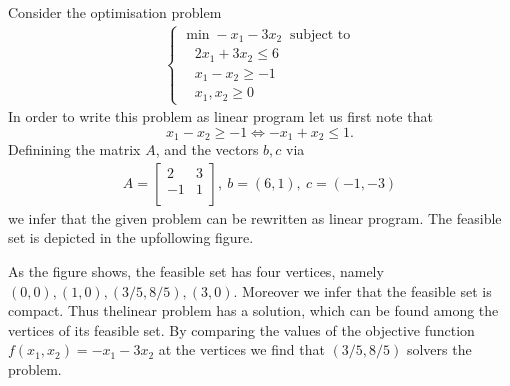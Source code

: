     \begin{example}
        Consider the optimisation problem
        \begin{align*}
            \begin{cases}
                \min -x_{1} - 3x_{2} ~\text{ subject to}\\
                ~~~~ 2x_{1} + 3x_{2}\leq 6\\
                ~~~~ x_{1} - x_{2}\geq -1\\
                ~~~~ x_{1}, x_{2} \geq 0
            \end{cases}                        
        \end{align*}
        In order to write this problem as linear program let us first note that
        \begin{equation*}
            x_{1} - x_{2}\geq -1 \iff -x_{1} + x_{2}\leq 1.
        \end{equation*}
        Definining the matrix $A$, and the vectors $b, c$ via
        \begin{align*}
            A = 
            \begin{bmatrix}
                2 & 3\\
                -1 & 1\\
            \end{bmatrix}, 
            ~b = (6, 1), ~c = (-1, -3)
        \end{align*}
        we infer that the given problem can be rewritten as linear program. The feasible set is depicted in the upfollowing figure. \newline
        \newline
        As the figure shows, the feasible set has four vertices, namely $(0, 0), (1, 0), (3 / 5, 8 / 5), (3, 0)$. Moreover we infer that the 
        feasible set is compact. Thus thelinear problem has a solution, which can be found among the vertices of its feasible set. By comparing the 
        values of the objective function $f(x_{1}, x_{2}) = -x_{1} - 3x_{2}$ at the vertices we find that $(3 / 5, 8 / 5)$ solvers the problem.
    \end{example}
